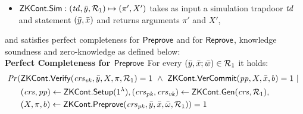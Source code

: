 \begin{definition}[ZK Continuations]
\begin{itemize}
\item ${\mathsf{ZKCont}}.{\mathsf{Sim}}: (\mathit{td}, \bar{y}, \mathcal{R}_1) \mapsto (\pi', X')$ takes as input a simulation trapdoor $\mathit{td}$ and statement $(\bar{y}, \bar{x})$ and returns 
arguments $\pi'$ and $X'$,
\end{itemize}
and satisfies perfect completeness for ${\mathsf{Preprove}}$ and for ${\mathsf{Reprove}}$,  knowledge soundness and zero-knowledge as defined below:\\
\noindent \textbf{Perfect Completeness for ${\mathsf{Preprove}}$} For every $(\bar{y}, \bar{x}; \bar{w}) \in \mathcal{R}_1$ it holds:
\begin{align*}
\mathit{Pr} (& {\mathsf{ZKCont}}.{\mathsf{Verify}}(\mathit{crs}_{\mathit{vk}}, \bar{y}, X, \pi, \mathcal{R}_1) = 1 \ \wedge \ {\mathsf{ZKCont}}.{\mathsf{VerCommit}} (\mathit{pp}, X, \bar{x}, b) = 1\  | \ \\ 
                   & (\mathit{crs}, \mathit{pp}) \leftarrow {\ensuremath{\mathsf{ZKCont}}}.{\mathsf{Setup}} (1^{\lambda}), (\mathit{crs}_{\mathit{pk}}, \mathit{crs}_{\mathit{vk}}) \leftarrow {\ensuremath{\mathsf{ZKCont}}}.\mathsf{Gen}(\mathit{crs}, \mathcal{R}_1), \\ 
                   & (X, \pi, b) \leftarrow {\ensuremath{\mathsf{ZKCont}}}.{\mathsf{Preprove}}(\mathit{crs}_{\mathit{pk}}, \bar{y}, \bar{x}, \bar{\omega}, \mathcal{R}_1)) = 1
\end{align*}


\end{definition}
